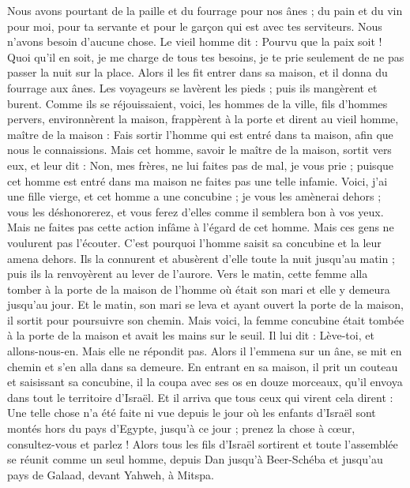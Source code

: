 \begin{multicols}{2}
Nous avons pourtant de la paille et du fourrage pour nos ânes ; du pain et du vin pour moi, pour ta servante et pour le garçon qui est avec tes serviteurs. Nous n'avons besoin d'aucune chose.
Le vieil homme dit : Pourvu que la paix soit ! Quoi qu'il en soit, je me charge de tous tes besoins, je te prie seulement de ne pas passer la nuit sur la place.
Alors il les fit entrer dans sa maison, et il donna du fourrage aux ânes. Les voyageurs se lavèrent les pieds ; puis ils mangèrent et burent.
Comme ils se réjouissaient, voici, les hommes de la ville, fils d'hommes pervers, environnèrent la maison, frappèrent à la porte et dirent au vieil homme, maître de la maison : Fais sortir l'homme qui est entré dans ta maison, afin que nous le connaissions.
Mais cet homme, savoir le maître de la maison, sortit vers eux, et leur dit : Non, mes frères, ne lui faites pas de mal, je vous prie ; puisque cet homme est entré dans ma maison ne faites pas une telle infamie.
Voici, j'ai une fille vierge, et cet homme a une concubine ; je vous les amènerai dehors ; vous les déshonorerez, et vous ferez d'elles comme il semblera bon à vos yeux. Mais ne faites pas cette action infâme à l'égard de cet homme.
Mais ces gens ne voulurent pas l'écouter. C'est pourquoi l'homme saisit sa concubine et la leur amena dehors. Ils la connurent et abusèrent d'elle toute la nuit jusqu'au matin ; puis ils la renvoyèrent au lever de l'aurore.
Vers le matin, cette femme alla tomber à la porte de la maison de l'homme où était son mari et elle y demeura jusqu'au jour.
Et le matin, son mari se leva et ayant ouvert la porte de la maison, il sortit pour poursuivre son chemin. Mais voici, la femme concubine était tombée à la porte de la maison et avait les mains sur le seuil.
Il lui dit : Lève-toi, et allons-nous-en. Mais elle ne répondit pas. Alors il l'emmena sur un âne, se mit en chemin et s'en alla dans sa demeure.
En entrant en sa maison, il prit un couteau et saisissant sa concubine, il la coupa avec ses os en douze morceaux, qu'il envoya dans tout le territoire d'Israël.
Et il arriva que tous ceux qui virent cela dirent : Une telle chose n'a été faite ni vue depuis le jour où les enfants d'Israël sont montés hors du pays d'Egypte, jusqu'à ce jour ; prenez la chose à cœur, consultez-vous et parlez !
\VerseOne{}Alors tous les fils d'Israël sortirent et toute l'assemblée se réunit comme un seul homme, depuis Dan jusqu'à Beer-Schéba et jusqu'au pays de Galaad, devant Yahweh, à Mitspa.

\end{multicols}
